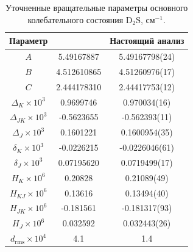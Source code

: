 \begin{landscape}
\begin{table}[htbp]
\centering
\caption{Уточненные вращательные параметры основного колебательного состояния D$_2$S, см$^{-1}$.}
\label{tab:d2s_ground_parameters}
\small
\begin{tabular}{|c|c|c|}
\hline
Параметр & \cite{d2s_camy1985} & Настоящий анализ \\
\hline
$A$ & 5.49167887 & 5.49167798(24) \\
$B$ & 4.512610865 & 4.51260976(17) \\
$C$ & 2.444178310 & 2.44417753(12) \\
$\Delta_K\times10^3$ & 0.9699746 & 0.970034(16) \\
$\Delta_{JK}\times10^3$ & -0.5623655 & -0.562393(11) \\
$\Delta_J\times10^3$ & 0.1601221 & 0.1600954(35) \\
$\delta_K\times10^3$ & -0.0226215 & -0.0226046(61) \\
$\delta_J\times10^3$ & 0.07195620 & 0.0719499(17) \\
$H_K\times10^6$ & 0.20828 & 0.21089(49) \\
$H_{KJ}\times10^6$ & 0.13616 & 0.13494(40) \\
$H_{JK}\times10^6$ & -0.181561 & -0.181317(93) \\
$H_J\times10^6$ & 0.032592 & 0.032443(26) \\
$d_{\textrm{rms}}\times10^4$ & 4.1 & 1.4 \\
\hline
\end{tabular}
\end{table}
\end{landscape}
